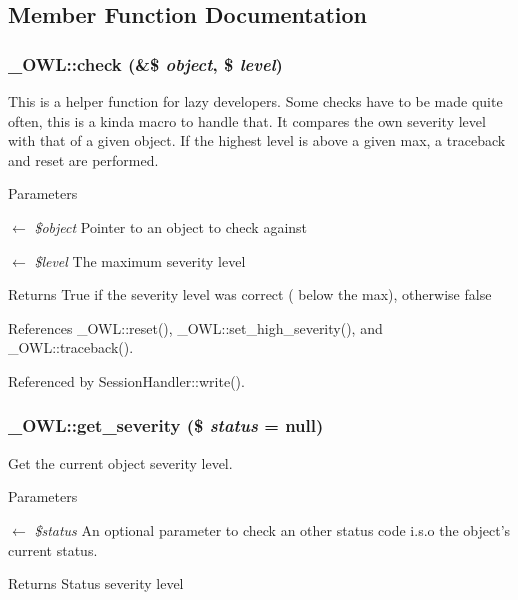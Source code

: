 \subsection{Member Function Documentation}
\subsubsection[{check}]{\setlength{\rightskip}{0pt plus 5cm}\_\-OWL::check (\&\$ {\em object}, \/  \$ {\em level})}\label{class__OWL_ad6f4f6946f40199dd0333cf219fa500e}
This is a helper function for lazy developers. Some checks have to be made quite often, this is a kinda macro to handle that. It compares the own severity level with that of a given object. If the highest level is above a given max, a traceback and reset are performed.


\begin{DoxyParams}{Parameters}
\item[\mbox{$\leftarrow$} {\em \$object}]Pointer to an object to check against \item[\mbox{$\leftarrow$} {\em \$level}]The maximum severity level \end{DoxyParams}
\begin{DoxyReturn}{Returns}
True if the severity level was correct ( below the max), otherwise false 
\end{DoxyReturn}


References \_\-OWL::reset(), \_\-OWL::set\_\-high\_\-severity(), and \_\-OWL::traceback().



Referenced by SessionHandler::write().

\subsubsection[{get\_\-severity}]{\setlength{\rightskip}{0pt plus 5cm}\_\-OWL::get\_\-severity (\$ {\em status} = {\ttfamily null})}\label{class__OWL_adf9509ef96858be7bdd9414c5ef129aa}
Get the current object severity level.


\begin{DoxyParams}{Parameters}
\item[\mbox{$\leftarrow$} {\em \$status}]An optional parameter to check an other status code i.s.o the object's current status. \end{DoxyParams}
\begin{DoxyReturn}{Returns}
Status severity level 
\end{DoxyReturn}



